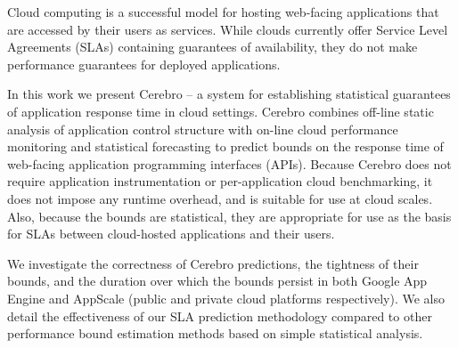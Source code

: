 Cloud computing is a successful model for hosting web-facing
applications that are accessed by their users as services.  While clouds
currently offer Service Level Agreements (SLAs) containing guarantees of
availability, they do not make performance guarantees for deployed
applications.

In this work we present Cerebro -- a system for establishing statistical
guarantees of application response time in cloud settings.  Cerebro combines
off-line static analysis of application control structure with on-line cloud
performance monitoring and statistical forecasting to predict bounds on the
response time of web-facing application programming interfaces (APIs).
Because Cerebro does not require application instrumentation or 
per-application cloud benchmarking, it does not impose any runtime overhead,
and is suitable for use at cloud scales.  Also, because the bounds are
statistical, they are appropriate for use as the basis for SLAs between
cloud-hosted applications and their users.

We investigate the correctness of Cerebro predictions, the tightness of their
bounds, and the duration over which the bounds persist in both Google App
Engine and AppScale (public and private cloud platforms respectively).  
We also detail the effectiveness of our SLA prediction methodology compared 
to other performance bound estimation methods based on simple statistical
analysis. 



